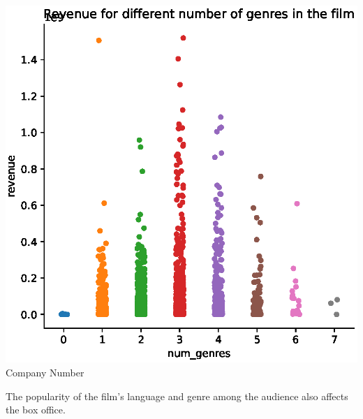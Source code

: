 \begin{center}
  \hfill
  \begin{minipage}{0.3\linewidth}
  \centering
    \includegraphics[width=0.8\linewidth]{figures//counrty.eps}
  {\small{Company Number}}
  \end{minipage}
\end{center}

The popularity of the film's language and genre among the audience also affects the box office.

